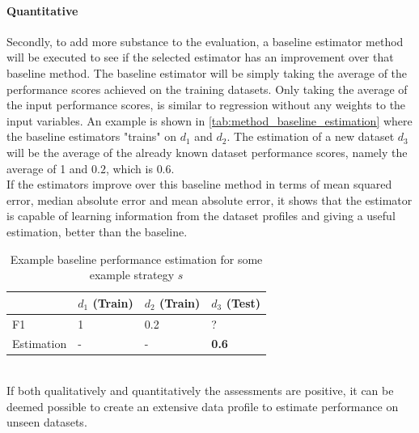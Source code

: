 \paragraph{Quantitative} Secondly, to add more substance to the evaluation, a baseline estimator method will be executed to see if the selected estimator has an improvement over that baseline method. The baseline estimator will be simply taking the average of the performance scores achieved on the training datasets. Only taking the average of the input performance scores, is similar to regression without any weights to the input variables.
An example is shown in \autoref{tab:method_baseline_estimation} where the baseline estimators "trains" on $d_1$ and $d_2$. The estimation of a new dataset $d_3$ will be the average of the already known dataset performance scores, namely the average of 1 and $0.2$, which is $0.6$.
\\If the estimators improve over this baseline method in terms of mean squared error, median absolute error and mean absolute error, it shows that the estimator is capable of learning information from the dataset profiles and giving a useful estimation, better than the baseline.

\begin{table}[]
\centering
\begin{tabular}{l|lll}
           & $d_1$ (Train) & $d_2$ (Train) & $d_3$ (Test) \\ \hline
F1         & 1             & 0.2             & ?            \\
Estimation & -             & -             & \textbf{0.6}
\end{tabular}
\caption{Example baseline performance estimation for some example strategy $s$}
\label{tab:method_baseline_estimation}
\end{table}

~\\If both qualitatively and quantitatively the assessments are positive, it can be deemed possible to create an extensive data profile to estimate performance on unseen datasets.